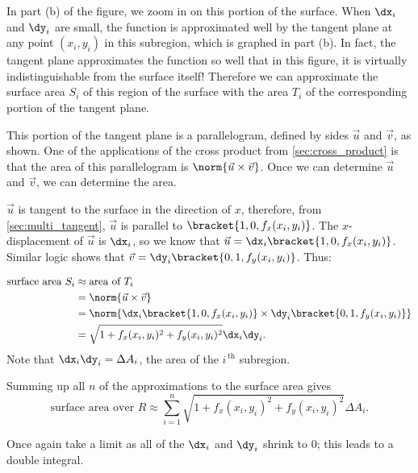 In part (b) of the figure, we zoom in on this portion of the surface. When $\dx_i$ and $\dy_i$ are small, the function is approximated well by the tangent plane at any point $(x_i,y_i)$ in this subregion, which is graphed in part (b). In fact, the tangent plane approximates the function so well that in this figure, it is virtually indistinguishable from the surface itself! Therefore we can approximate the surface area $S_i$ of this region of the surface with the area $T_i$ of the corresponding portion of the tangent plane.

This portion of the tangent plane is a parallelogram, defined by sides $\vec u$ and $\vec v$, as shown. One of the applications of the cross product from \autoref{sec:cross_product} is that the area of this parallelogram is $\norm{\vec u\times \vec v}$. Once we can determine $\vec u$ and $\vec v$, we can determine the area.

$\vec u$ is tangent to the surface in the direction of $x$, therefore, from \autoref{sec:multi_tangent}, $\vec u$ is parallel to $\bracket{1,0,f_x(x_i,y_i)}$. The $x$-displacement of $\vec u$ is $\dx_i$, so we know that $\vec u = \dx_i\bracket{1,0,f_x(x_i,y_i)}$. Similar logic shows that $\vec v = \dy_i\bracket{0,1,f_y(x_i,y_i)}$. Thus:

\begin{align*}
\text{surface area $S_i$} &\approx \text{area of  $T_i$}\\
				&= \norm{\vec u\times \vec v}\\
				&= \norm{\dx_i\bracket{1,0,f_x(x_i,y_i)}\times\dy_i\bracket{0,1,f_y(x_i,y_i)}}\\
				&=\sqrt{1+f_x(x_i,y_i)^2+f_y(x_i,y_i)^2}\dx_i\dy_i.
\end{align*}
Note that $\dx_i\dy_i = \Delta A_i$, the area of the $i^{\,\text{th}}$ subregion.

Summing up all $n$ of the approximations to the surface area gives
$$\text{surface area over $R$} \approx \sum_{i=1}^n \sqrt{1+f_x(x_i,y_i)^2+f_y(x_i,y_i)^2}\Delta A_i.$$

Once again take a limit as all of the $\dx_i$ and $\dy_i$ shrink to 0; this leads to a double integral.


